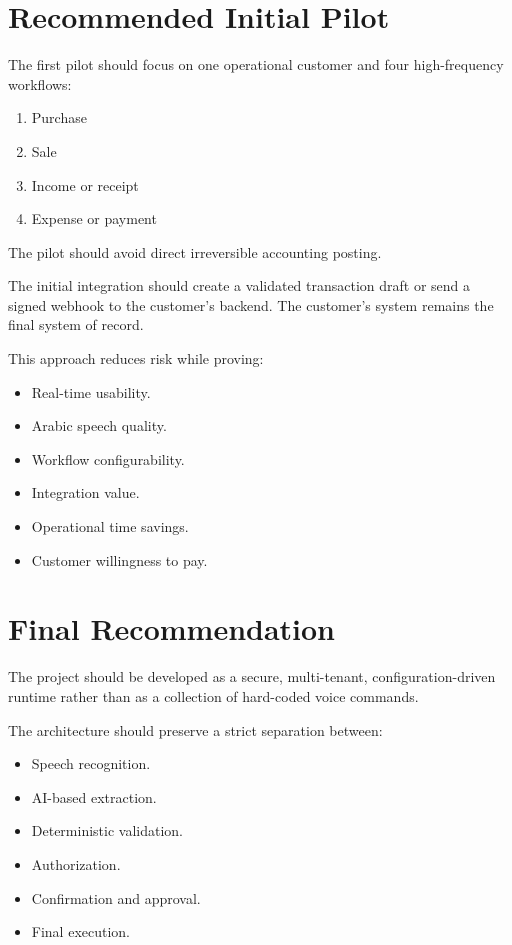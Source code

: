 \documentclass[11pt,a4paper]{article}
\begin{document}
\section{Recommended Initial Pilot}

The first pilot should focus on one operational customer and four
high-frequency workflows:

\begin{enumerate}
\item Purchase
\item Sale
\item Income or receipt
\item Expense or payment
\end{enumerate}

The pilot should avoid direct irreversible accounting posting.

The initial integration should create a validated transaction draft or
send a signed webhook to the customer's backend. The customer's system
remains the final system of record.

This approach reduces risk while proving:

\begin{itemize}
\item Real-time usability.
\item Arabic speech quality.
\item Workflow configurability.
\item Integration value.
\item Operational time savings.
\item Customer willingness to pay.
\end{itemize}

\section{Final Recommendation}

The project should be developed as a secure, multi-tenant,
configuration-driven runtime rather than as a collection of hard-coded
voice commands.

The architecture should preserve a strict separation between:

\begin{itemize}
\item Speech recognition.
\item AI-based extraction.
\item Deterministic validation.
\item Authorization.
\item Confirmation and approval.
\item Final execution.
\end{itemize}
\end{document}
